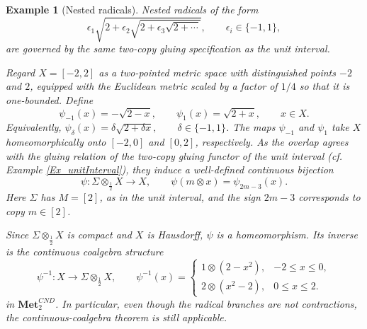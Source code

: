 \documentclass{sn-jnl}%
\theoremstyle{thmstyleone}%
\theoremstyle{thmstyletwo}%
\newtheorem{example}{Example}%
\theoremstyle{thmstylethree}%
\newcommand{\mcndk}[1]{\mathbf{Met}_{#1}^{CND}}
\newcommand{\M}{\Sigma}
\newcommand{\Fww}[1]{\M\otimes_{#1}}
\begin{document}
\begin{example}[Nested radicals]\label{Ex_Nested_Radicals_IFS}
    Nested radicals of the form
    \begin{equation} 
    \nonumber
       \epsilon_1\sqrt{ 2+\epsilon_2\sqrt{ 2+\epsilon_3\sqrt{2+\cdots} }}, \qquad        \epsilon_i\in\{-1,1\},
    \end{equation}
    are governed by the same two-copy gluing specification as the unit interval. 
    
    Regard $X=[-2,2]$ as a two-pointed metric space with distinguished points $-2$ and $2$, equipped with the Euclidean metric scaled by a factor of $1/4$ so that it is one-bounded. Define
    \begin{equation} \nonumber
       \psi_{-1}(x)=-\sqrt{2-x}, \qquad \psi_1(x)=\sqrt{2+x}, \qquad x\in X.
    \end{equation}
    Equivalently, $ \psi_\delta(x)=\delta\sqrt{2+\delta x}, \qquad \delta\in\{-1,1\}$.     The maps $\psi_{-1}$ and $\psi_1$ take $X$ homeomorphically onto $[-2,0]$ and $[0,2]$, respectively. As the overlap agrees with the gluing relation of the two-copy gluing functor of the unit interval (cf. Example \ref{Ex_unitInterval}), they induce a well-defined continuous bijection
    \begin{equation} 
    \nonumber
       \psi:\Fww{\frac12}X\longrightarrow X, \qquad \psi(m\otimes x)=\psi_{2m-3}(x).
    \end{equation}
    Here $\Sigma$ has $M=[2]$, as in the unit interval, and the sign $2m-3$ corresponds to copy $m\in[2]$.
    
    Since $\Fww{\frac12}X$ is compact and $X$ is Hausdorff, $\psi$ is a homeomorphism. Its inverse is the continuous coalgebra structure
    \begin{equation} 
    \nonumber
       \psi^{-1}:X\longrightarrow\Fww{\frac12}X, \qquad
       \psi^{-1}(x)=
       \begin{cases}
          1\otimes(2-x^2), & -2\leq x\leq0,\\[1mm]
          2\otimes(x^2-2), & 0\leq x\leq2.
       \end{cases}
    \end{equation}
    in $\mcndk{2}$. In particular, even though the radical branches are not contractions, the continuous-coalgebra theorem is still applicable.
    

\end{example}
\end{document}
